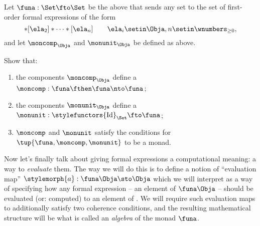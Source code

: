 \begin{gradedexercise}
    \label{ex:ListMonad}
    Let $\funa : \Set \fto \Set$ be the  above that sends any set \Obja to the set of first-order formal expressions of the form
    \begin{equation}
        [\ela_1]
        * [\ela_2] * \cdots * [\ela_n] \quad \quad \ela_i \setin \Obja, n \setin \wnumbers_{\geq 0},
    \end{equation}
    and let $\moncomp_\Obja$ and $\monunit_\Obja$ be defined as above.

    Show that:
    \begin{enumerate}
        \item the components $\moncomp_\Obja$ define a  $\moncomp : \funa \fthen \funa \nto \funa$;
        \item the components $\monunit_\Obja$ define a  $\monunit : \stylefunctors{\text{Id}}_{\Set} \fto \funa$;
        \item $\moncomp$ and $\monunit$ satisfy the conditions for $\tup{\funa, \moncomp, \monunit}$ to be a monad.
    \end{enumerate}
\end{gradedexercise}


Now let's finally talk about giving formal expressions a computational meaning: a way to \emph{evaluate} them.
The way we will do this is to define a notion of ``evaluation map'' $\stylemorph{a}: \funa \Obja \sto \Obja$ which we will interpret as a way of specifying how any formal expression -- an element of $\funa \Obja$ -- should be evaluated (or: computed) to an element of \Obja.
We will require such evaluation maps to additionally satisfy two coherence conditions, and the resulting mathematical structure will be what is called an \emph{algebra} of the monad $\funa$.


